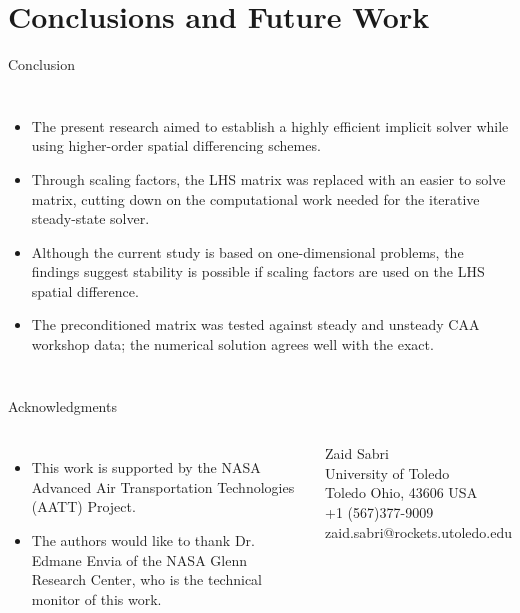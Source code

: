 \section{Conclusions and Future Work}
\begin{frame}{Conclusion}
  \begin{columns}
    \begin{itemize}
      \item The present research aimed to establish a highly efficient implicit solver while
        using higher-order spatial differencing schemes. 
      \item Through scaling factors, the LHS matrix was replaced with an easier to solve matrix,
        cutting down on the computational work needed for the iterative steady-state solver. 
      \item Although the current study is based on one-dimensional problems, the findings
        suggest stability is possible if scaling factors are used on the LHS spatial difference.
      \item The preconditioned matrix was tested against steady and unsteady CAA workshop data;
        the numerical solution agrees well with the exact.  
    \end{itemize}
  \end{columns}
\end{frame}

\begin{frame}{Acknowledgments}
  \begin{columns}
        \begin{itemize}
        \item This work is supported by the NASA Advanced Air Transportation Technologies (AATT)
          Project. 
        \item The authors would like to thank Dr. Edmane Envia of the NASA Glenn Research Center,
          who is the technical monitor of this work.
        \end{itemize}
        \begin{block}{}
        	Zaid Sabri \\
        	University of Toledo \\
        	Toledo Ohio, 43606 USA \\
        	+1 (567)377-9009 \\
        	zaid.sabri@rockets.utoledo.edu
        \end{block}
  \end{columns}
\end{frame} 
    

